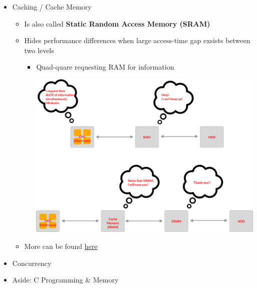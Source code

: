 \documentclass[12pt]{article}
\begin{document}
\begin{itemize}
    \item Caching / Cache Memory

    \begin{itemize}
        \item Is also called \textbf{Static Random Access Memory (SRAM)}
        \item Hides performance differences when large access-time gap exsists
        between two levels
        \begin{itemize}
            \item Quad-quare requesting RAM for information

            \begin{center}
            \includegraphics[width=\linewidth]{images/week_1_notes_1_4.png}
            \end{center}

        \end{itemize}
        \item More can be found \href{https://www.youtube.com/watch?v=Zr8WKIOIKsk}{here}
    \end{itemize}
    \item Concurrency
    \item Aside: C Programming \& Memory
\end{itemize}
\end{document}
